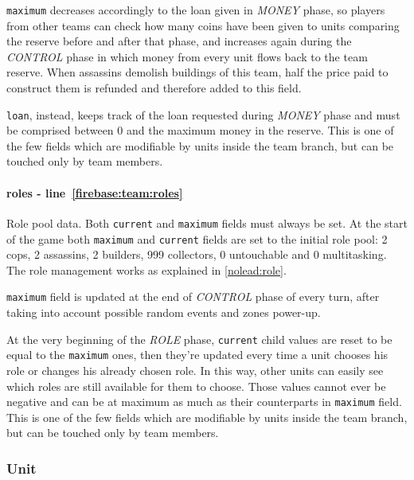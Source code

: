 				\lstinline|maximum| decreases accordingly to the loan given in \emph{MONEY} phase, so players from other teams can check how many coins have been given to units comparing the reserve before and after that phase, and increases again during the \emph{CONTROL} phase in which money from every unit flows back to the team reserve.
				When assassins demolish buildings of this team, half the price paid to construct them is refunded and therefore added to this field.
				
				\lstinline|loan|, instead, keeps track of the loan requested during \emph{MONEY} phase and must be comprised between 0 and the maximum money in the reserve. This is one of the few fields which are modifiable by units inside the team branch, but can be touched only by team members.
				
				\paragraph{roles - line~\ref{firebase:team:roles}}
				Role pool data. Both \lstinline|current| and \lstinline|maximum| fields must always be set. At the start of the game both \lstinline|maximum| and \lstinline|current| fields are set to the initial role pool: 2 cops, 2 assassins, 2 builders, 999 collectors, 0 untouchable and 0 multitasking.
				The role management works as explained in \autoref{nolead:role}.
				
				\lstinline|maximum| field is updated at the end of \emph{CONTROL} phase of every turn, after taking into account possible random events and zones power-up.
				
				At the very beginning of the \emph{ROLE} phase, \lstinline|current| child values are reset to be equal to the \lstinline|maximum| ones, then they're updated every time a unit chooses his role or changes his already chosen role. In this way, other units can easily see which roles are still available for them to choose.
				Those values cannot ever be negative and can be at maximum as much as their counterparts in \lstinline|maximum| field.
				This is one of the few fields which are modifiable by units inside the team branch, but can be touched only by team members.
			
			\subsubsection{Unit}
			
				
			
